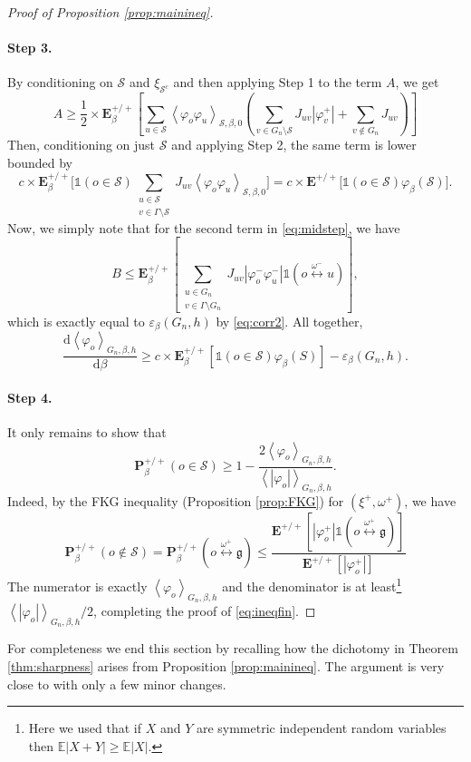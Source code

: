 \documentclass{article}
\numberwithin{equation}{section}
\theoremstyle{definition}
\theoremstyle{definition}
\theoremstyle{remark}
\renewcommand{\d}{\mathrm{d}}
\newcommand{\E}{\mathbb{E}}
\newcommand\vp{\varphi}
\renewcommand{\d}{\mathrm{d}}
\newcommand{\w}{\omega}
\newcommand{\vpp}{\vp^+}
\newcommand{\vpm}{\vp^-}
\renewcommand{\P}{\mathrm{\mathbf{P}}}
\renewcommand{\E}{\mathrm{\mathbf{E}}}
\renewcommand{\L}{\xi}
\renewcommand{\i}{\mathds{1}}
\renewcommand{\S}{\mathcal{S}}
\newcommand{\eps}{\varepsilon}
\newcommand{\G}{\Gamma}
\newcommand{\g}{\mathfrak{g}}
\begin{document}
\begin{proof}[Proof of Proposition \ref{prop:mainineq}]
	\paragraph{Step 3.} By conditioning on $\S$ and $\L_{\S^c}$ and then applying Step 1 to the term $A$, we get
	\begin{equation*}
		A \geq \frac{1}{2} \times \E^{+ / +}_\beta\left[ \sum_{u \in \S} \left< \vp_o\vp_u \right>_{\S,\beta,0}( \sum_{v \in G_n \setminus \S} J_{uv}|\vpp_v| + \sum_{v \not\in G_n} J_{uv})\right]
	\end{equation*}
	Then, conditioning on just $\S$ and applying Step 2, the same term is lower bounded by 
	\[
		c \times \E^{+ / +}_{\beta} \Bigg[ \i(o \in \S) \sum_{\substack{ u \in \S \\ v \in \G \setminus \S}}J_{uv} \left< \vp_o \vp_u \right>_{\S,\beta,0} \Bigg] = c \times \E^{+ / +}\Bigg[ \i(o \in \S) \vp_\beta(\S) \Bigg].
	\] 
	Now, we simply note that for the second term in \eqref{eq:midstep}, we have
	\[
		B \leq  \E^{+ / +}_\beta\left[ \sum_{\substack{ u \in G_n \\ v \in \G \setminus G_n}} J_{uv} |\vpm_o\vpm_u |\i(o \overset{\w^-}{\longleftrightarrow} u)\right],
	\] 
	which is exactly equal to $\eps_\beta(G_n,h)$ by \eqref{eq:corr2}. All together, 
	\[
		\frac{\d \left< \vp_o  \right>_{G_n,\beta,h}}{\d \beta} \geq c \times \E^{+ / +}_\beta \left[ \i(o \in \S) \vp_\beta(S) \right] - \eps_\beta(G_n,h).
	\] 
	\paragraph{Step 4. } It only remains to show that
	\[
		\P^{ + / +}_\beta(o \in \S) \geq 1 - \frac{2\left< \vp_o \right>_{G_n,\beta,h}}{\left<|\vp_o| \right>_{G_n,\beta,h}}.
	\] 
	Indeed, by the FKG inequality (Proposition \ref{prop:FKG}) for $(\L^+,\w^+)$, we have
	\[
		\P^{ + / +}_\beta(o \not\in \S) = \P^{+ / +}_\beta(o \overset{\w^+}{\longleftrightarrow} \g) \leq \frac{\E^{+ / +}[ |\vpp_o|\i(o \overset{\w^+}{\longleftrightarrow} \g)]}{\E^{+ / +}\left[ |\vpp_o| \right] }
	\]
	The numerator is exactly $\left< \vp_o \right>_{G_n,\beta,h}$ and the denominator is at least{\hypersetup{linkcolor=black}\footnote{Here we used that if $X$ and $Y$ are symmetric independent random variables then $\mathbb{E}|X+Y| \geq \mathbb{E}|X|$.}} $ \left< |\vp_o| \right>_{G_n,\beta,h} / 2$, completing the proof of \eqref{eq:ineqfin}.
\end{proof}


For completeness we end this section by recalling how the dichotomy in Theorem \ref{thm:sharpness} arises from Proposition \ref{prop:mainineq}. The argument is very close to \cite{DCT} with only a few minor changes. 
\end{document}
